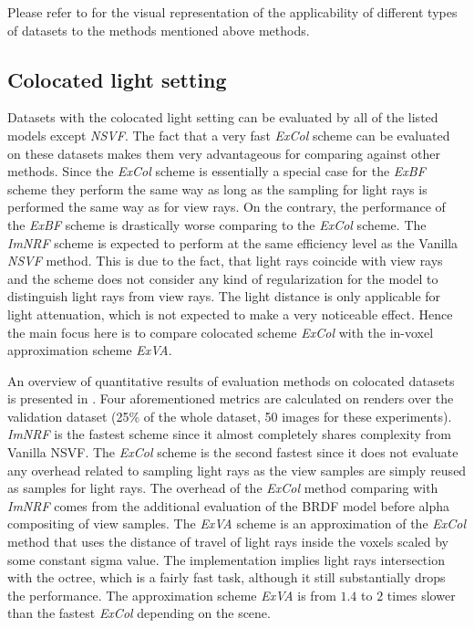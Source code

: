 Please refer to  for the visual representation of the applicability of different types of datasets to the methods mentioned above methods.






\subsection{Colocated light setting}
\label{subsec:experiments_coloc}

Datasets with the colocated light setting can be evaluated by all of the listed models except \textit{NSVF}.
The fact that a very fast \textit{ExCol} scheme can be evaluated on these datasets
makes them very advantageous for comparing against other methods.
Since the \textit{ExCol} scheme is essentially a special case for the \textit{ExBF} scheme
they perform the same way as long as the sampling for light rays is performed the same way as for view rays.
On the contrary, the performance of the \textit{ExBF} scheme is drastically worse comparing to the \textit{ExCol} scheme.
The \textit{ImNRF} scheme is expected to perform at the same efficiency level as the Vanilla \textit{NSVF} method.
This is due to the fact, that light rays coincide with view rays 
and the scheme does not consider any kind of regularization for the model
to distinguish light rays from view rays.
The light distance is only applicable for light attenuation, 
which is not expected to make a very noticeable effect.
Hence the main focus here is to compare colocated scheme \textit{ExCol} with the in-voxel approximation scheme \textit{ExVA}.





An overview of quantitative results of evaluation methods on colocated datasets is presented in .
Four aforementioned metrics are calculated on renders over the validation dataset (25\% of the whole dataset, 50 images for these experiments).
\textit{ImNRF} is the fastest scheme since it almost completely shares complexity from Vanilla NSVF.
The \textit{ExCol} scheme is the second fastest
since it does not evaluate any overhead related to sampling light rays
as the view samples are simply reused as samples for light rays.
The overhead of the \textit{ExCol} method comparing with \textit{ImNRF} comes from the additional evaluation of the BRDF model before alpha compositing of view samples.
The \textit{ExVA} scheme is an approximation of the \textit{ExCol} method
that uses the distance of travel of light rays inside the voxels scaled by some constant sigma value.
The implementation implies light rays intersection with the octree,
which is a fairly fast task, although it still substantially drops the performance.
The approximation scheme \textit{ExVA} is from $1.4$ to $2$ times slower
than the fastest \textit{ExCol} depending on the scene.


